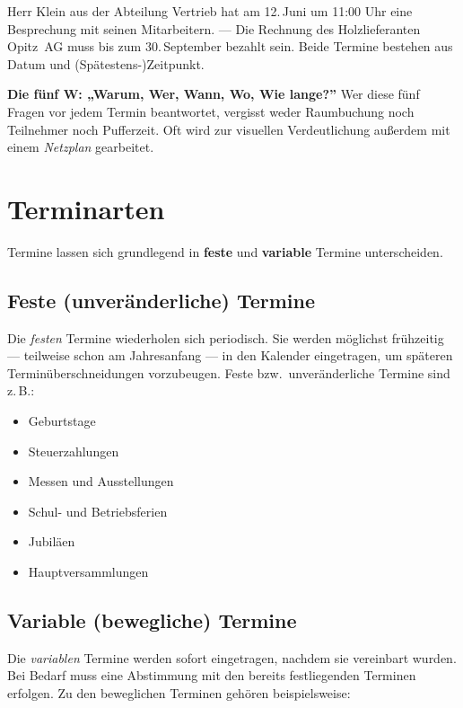 \documentclass[11pt, a4paper]{article}
\begin{document}
\begin{beispiel}
Herr Klein aus der Abteilung Vertrieb hat am 12.\,Juni um 11:00 Uhr eine Besprechung mit
seinen Mitarbeitern. --- Die Rechnung des Holzlieferanten Opitz~AG muss bis zum
30.\,September bezahlt sein. Beide Termine bestehen aus Datum und (Spätestens-)Zeitpunkt.
\end{beispiel}

\begin{eselsbruecke}
\textbf{Die fünf W: „Warum, Wer, Wann, Wo, Wie lange?”} Wer diese fünf Fragen vor jedem
Termin beantwortet, vergisst weder Raumbuchung noch Teilnehmer noch Pufferzeit. Oft wird
zur visuellen Verdeutlichung außerdem mit einem \emph{Netzplan} gearbeitet.
\end{eselsbruecke}

\section{Terminarten}

Termine lassen sich grundlegend in \textbf{feste} und \textbf{variable} Termine
unterscheiden.

\subsection{Feste (unveränderliche) Termine}

Die \emph{festen} Termine wiederholen sich periodisch. Sie werden möglichst frühzeitig
--- teilweise schon am Jahresanfang --- in den Kalender eingetragen, um späteren
Terminüberschneidungen vorzubeugen. Feste bzw.\ unveränderliche Termine sind z.\,B.:

\begin{itemize}
  \item Geburtstage
  \item Steuerzahlungen
  \item Messen und Ausstellungen
  \item Schul- und Betriebsferien
  \item Jubiläen
  \item Hauptversammlungen
\end{itemize}

\subsection{Variable (bewegliche) Termine}

Die \emph{variablen} Termine werden sofort eingetragen, nachdem sie vereinbart wurden.
Bei Bedarf muss eine Abstimmung mit den bereits festliegenden Terminen erfolgen. Zu den
beweglichen Terminen gehören beispielsweise:
\end{document}
